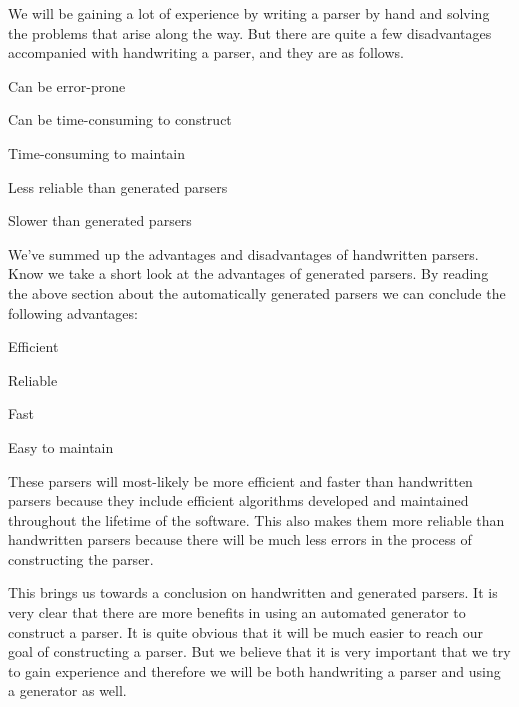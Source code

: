 We will be gaining a lot of experience by writing a parser by hand and solving the problems that arise along the way. But there are quite a few disadvantages accompanied with handwriting a parser, and they are as follows.

\begin{dlist}
\item Can be error-prone
\item Can be time-consuming to construct
\item Time-consuming to maintain
\item Less reliable than generated parsers
\item Slower than generated parsers
\end{dlist}

We've summed up the advantages and disadvantages of handwritten parsers. Know we take a short look at the advantages of generated parsers. By reading the above section about the automatically generated parsers we can conclude the following advantages:

\begin{dlist}
\item Efficient
\item Reliable
\item Fast
\item Easy to maintain
\end{dlist}

These parsers will most-likely be more efficient and faster than handwritten parsers because they include efficient algorithms developed and maintained throughout the lifetime of the software. This also makes them more reliable than handwritten parsers because there will be much less errors in the process of constructing the parser.

This brings us towards a conclusion on handwritten and generated parsers. It is very clear that there are more benefits in using an automated generator to construct a parser. It is quite obvious that it will be much easier to reach our goal of constructing a parser. But we believe that it is very important that we try to gain experience and therefore we will be both handwriting a parser and using a generator as well.